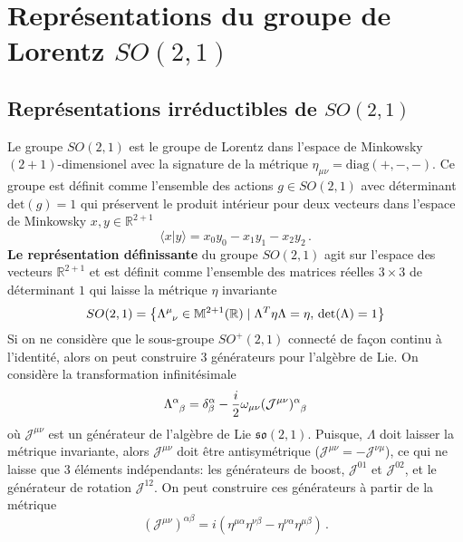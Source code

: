 \documentclass{article}
\numberwithin{equation}{section}
\theoremstyle{solution}
\begin{document}
\section{Représentations du groupe de Lorentz $SO(2, 1)$}

\subsection{Représentations irréductibles de $SO(2, 1)$}
Le groupe $SO(2, 1)$ est le groupe de Lorentz dans l'espace de Minkowsky $(2 + 1)$-dimensionel avec la signature de la métrique $\eta_{\mu\nu} = \mathrm{diag}(+, -, -)$. 
Ce groupe est définit comme l'ensemble des actions $g \in SO(2, 1)$ avec déterminant $ \mathrm{det}(g) = 1$
qui préservent le produit intérieur pour deux vecteurs dans l'espace de Minkowsky $x, y \in \mathbb{R}^{2+1}$
\begin{equation}
       \langle x | y \rangle = x_0y_0 - x_1y_1 - x_2y_2\, .
\end{equation} 
\textbf{Le représentation définissante} du groupe $SO(2, 1)$ agit sur l'espace des vecteurs $\mathbb{R}^{2+1}$ et est définit 
comme l'ensemble des matrices réelles $3\times 3$ de déterminant $1$ qui laisse la métrique $\eta$ invariante
\begin{equation}
        SO(2, 1) = \left\{ \Lambda\indices{^{\mu}_{\nu}} \in \mathbb{M}^{2+1}(\mathbb{R}) \mid \Lambda^{T}\eta\Lambda = \eta,\, \mathrm{det}(\Lambda) = 1 \right\}
\end{equation} 
Si on ne considère que le sous-groupe $SO^{+}(2, 1)$ connecté de façon continu à l'identité, alors on peut construire 
3 générateurs pour l'algèbre de Lie. On considère la transformation infinitésimale 
\begin{equation}
        \Lambda\indices{^{\alpha}_{\beta}} = \delta^{\alpha}_{\beta} - \frac{i}{2}\omega_{\mu \nu}(\mathcal{J}^{\mu\nu})\indices{^{\alpha}_{\beta}}
\end{equation} 
où $\mathcal{J}^{\mu\nu}$ est un générateur de l'algèbre de Lie $\mathfrak{so}(2, 1)$. Puisque, $\Lambda$ doit 
laisser la métrique invariante, alors $\mathcal{J}^{\mu\nu}$ doit être antisymétrique ($\mathcal{J}^{\mu \nu} = -\mathcal{J}^{\nu \mu}$), 
ce qui ne laisse que $3$ éléments indépendants: les générateurs de boost, $\mathcal{J}^{01}$ et $\mathcal{J}^{02}$, 
et le générateur de rotation $\mathcal{J}^{12}$. On peut construire ces générateurs à partir 
de la métrique
\begin{equation}
        (\mathcal{J}^{\mu \nu})^{\alpha \beta} = i (\eta^{\mu \alpha} \eta^{\nu \beta} - \eta^{\nu \alpha}\eta^{\mu \beta})\, .
\end{equation} 
\end{document}
